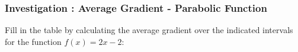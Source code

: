             \subsubsection{  Investigation : Average Gradient - Parabolic Function }
            \nopagebreak
      \label{m39223*id190208}Fill in the table by calculating the average gradient over the indicated
intervals for the function $f\left(x\right)=2x-2$:\par 
    \setlength\mytablespace{12\tabcolsep}
    \addtolength\mytablespace{7\arrayrulewidth}
    \setlength\mytablewidth{\linewidth}
    \setlength\mytableroom{\mytablewidth}
    \addtolength\mytableroom{-\mytablespace}
    \setlength\myfixedwidth{0pt}
    \setlength\mystarwidth{\mytableroom}
        \addtolength\mystarwidth{-\myfixedwidth}
        \divide{}
